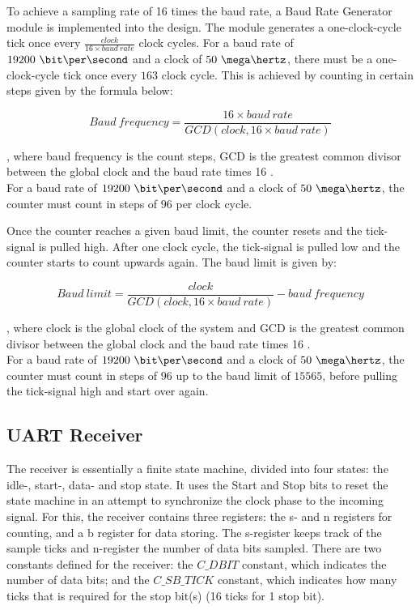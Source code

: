 \documentclass[main.tex]{subfiles}
\begin{document}
To achieve a sampling rate of 16 times the baud rate, a Baud Rate Generator module is implemented into the design. The module generates a one-clock-cycle tick once every $\frac{clock}{16 \times baud\ rate}$ clock cycles. For a baud rate of $19200~\bit\per\second$ and a clock of $50\ \mega\hertz$, there must be a one-clock-cycle tick once every $163$ clock cycle. This is achieved by counting in certain steps given by the formula below:

\begin{equation}
Baud\ frequency = \frac{16 \times baud\ rate}{GCD(clock, 16 \times baud\ rate)}
\end{equation}

, where baud frequency is the count steps, GCD is the greatest common divisor between the global clock and the baud rate times 16 \cite{velure10}. \\
For a baud rate of $19200\ \bit\per\second$ and a clock of $50\ \mega\hertz$, the counter must count in steps of $96$ per clock cycle. 

Once the counter reaches a given baud limit, the counter resets and the tick-signal is pulled high. After one clock cycle, the tick-signal is pulled low and the counter starts to count upwards again. The baud limit is given by:

\begin{equation}
Baud\ limit= \frac{clock}{GCD(clock, 16 \times baud\ rate)} - baud\ frequency
\end{equation}

, where clock is the global clock of the system and GCD is the greatest common divisor between the global clock and the baud rate times 16 \cite{velure10}. \\
For a baud rate of $19200\ \bit\per\second$ and a clock of $50\ \mega\hertz$, the counter must count in steps of $96$ up to the baud limit of $15565$, before pulling the tick-signal high and start over again. 

\subsection{UART Receiver}
The receiver is essentially a finite state machine, divided into four states: the idle-, start-, data- and stop state. It uses the Start and Stop bits to reset the state machine in an attempt to synchronize the clock phase to the incoming signal. For this, the receiver contains three registers: the s- and  n registers for counting, and a b register for data storing. The s-register keeps track of the sample ticks and n-register the number of data bits sampled.
There are two constants defined for the receiver: the $C\_DBIT$ constant, which indicates the number of data bits; and the $C\_SB\_TICK$ constant, which indicates how many ticks that is required for the stop bit(s) (16 ticks for 1 stop bit). 
\end{document}
